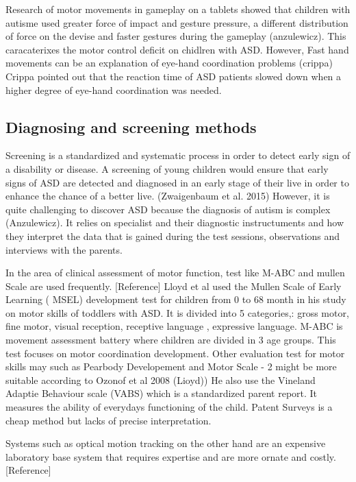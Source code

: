 Research of motor movements in gameplay on a tablets showed that children with autisme used greater force of impact and gesture pressure, a different distribution of force on the devise and faster gestures during the gameplay (anzulewicz). This caracaterixes the motor control deficit on chidlren with ASD. However,  Fast hand movements can be an explanation of eye-hand coordination problems (crippa) Crippa pointed out that the reaction time of ASD patients slowed down  when a higher degree of eye-hand coordination was needed.




\subsection{Diagnosing and screening methods}

Screening is a standardized and systematic process in order to detect early sign of a disability or disease. A screening of young children would ensure that early signs of ASD are detected and diagnosed in an early stage of their live in order to enhance the chance of a better live. (Zwaigenbaum et al. 2015)  
However, it is quite challenging to discover ASD because the diagnosis of autism is complex (Anzulewicz). It relies on specialist and their diagnostic instructuments and how they interpret the data that is gained during the test sessions, observations and interviews with the parents.


In the area of clinical assessment of motor function, test like M-ABC and mullen Scale are used frequently. [Reference]
Lloyd et al used the Mullen Scale of Early Learning ( MSEL) development test for children from 0 to 68 month in his study on motor skills of toddlers with ASD. It is divided into 5 categories,: gross motor, fine motor, visual reception,  receptive language , expressive language.
M-ABC is movement assessment battery where children are divided in 3 age groups. This test focuses on  motor coordination development.  
Other evaluation test for  motor skills may such as  Pearbody Developement and Motor Scale - 2 might be more suitable according to Ozonof et al 2008 (Lioyd))
He also use the Vineland Adaptie Behaviour scale (VABS) which is a standardized parent report. It measures the ability of everydays functioning of the child. Patent Surveys is a cheap method but lacks of precise interpretation.

Systems such as optical motion tracking on the other hand  are an expensive laboratory base system that requires expertise and are more ornate and costly. [Reference]

